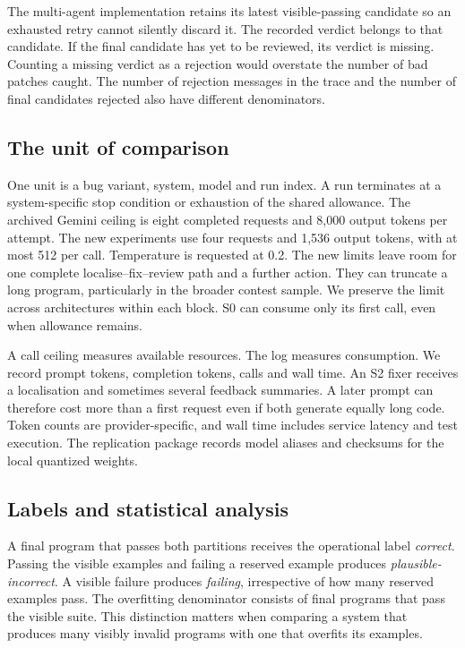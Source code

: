 \documentclass[conference]{IEEEtran}
\begin{document}
The multi-agent implementation retains its latest visible-passing candidate so an exhausted retry cannot silently discard it. The recorded verdict belongs to that candidate. If the final candidate has yet to be reviewed, its verdict is missing. Counting a missing verdict as a rejection would overstate the number of bad patches caught. The number of rejection messages in the trace and the number of final candidates rejected also have different denominators.

\subsection{The unit of comparison}
One unit is a bug variant, system, model and run index. A run terminates at a system-specific stop condition or exhaustion of the shared allowance. The archived Gemini ceiling is eight completed requests and 8,000 output tokens per attempt. The new experiments use four requests and 1,536 output tokens, with at most 512 per call. Temperature is requested at 0.2. The new limits leave room for one complete localise--fix--review path and a further action. They can truncate a long program, particularly in the broader contest sample. We preserve the limit across architectures within each block. S0 can consume only its first call, even when allowance remains.

A call ceiling measures available resources. The log measures consumption. We record prompt tokens, completion tokens, calls and wall time. An S2 fixer receives a localisation and sometimes several feedback summaries. A later prompt can therefore cost more than a first request even if both generate equally long code. Token counts are provider-specific, and wall time includes service latency and test execution. The replication package records model aliases and checksums for the local quantized weights.

\subsection{Labels and statistical analysis}
A final program that passes both partitions receives the operational label \emph{correct}. Passing the visible examples and failing a reserved example produces \emph{plausible-incorrect}. A visible failure produces \emph{failing}, irrespective of how many reserved examples pass. The overfitting denominator consists of final programs that pass the visible suite. This distinction matters when comparing a system that produces many visibly invalid programs with one that overfits its examples.
\end{document}

